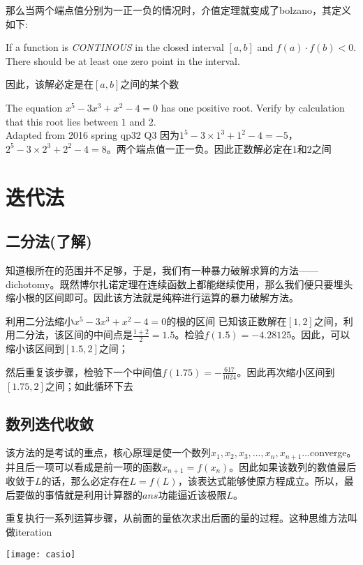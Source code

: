 那么当两个端点值分别为一正一负的情况时，介值定理就变成了\gls{bolzano}，其定义如下:
\begin{theorem}
If a function is \emph{CONTINOUS} in the closed interval $[a,b]$ and $f(a)\cdot f(b)<0$. There should be at least one zero point in the interval.
\end{theorem}
因此，该解必定是在$[a,b]$之间的某个数

\begin{ExampleBox}
The equation $x^5-3x^3+x^2-4=0$ has one positive root. Verify by calculation that this root lies between $1$ and $2$.\\
\makebox{}\hfill Adapted from 2016 spring qp32 Q3
\tcblower
因为$1^5-3\times 1^3+1^2-4=-5$，$2^5-3\times 2^3+2^2-4=8$。两个端点值一正一负。因此正数解必定在$1$和$2$之间
\end{ExampleBox}
\clearpage


\section{迭代法}
\subsection*{二分法(了解)}
知道根所在的范围并不足够，于是，我们有一种暴力破解求算的方法——\gls{dichotomy}。既然博尔扎诺定理在连续函数上都能继续使用，那么我们便只要埋头缩小根的区间即可。因此该方法就是纯粹进行运算的暴力破解方法。
\begin{ExampleBox}
利用二分法缩小$x^5-3x^3+x^2-4=0$的根的区间
\tcblower
已知该正数解在$[1,2]$之间，利用二分法，该区间的中间点是$\frac{1+2}{2}=1.5$。检验$f(1.5)=-4.28125$。因此，可以缩小该区间到$[1.5,2]$之间；

然后重复该步骤，检验下一个中间值$f(1.75)=-\frac{617}{1024}$。因此再次缩小区间到$[1.75,2]$之间；如此循环下去
\end{ExampleBox}
\clearpage

\subsection*{数列迭代收敛}
\noindent\begin{minipage}{0.5\linewidth}
该方法的是考试的重点，核心原理是使一个数列$x_1,x_2,x_3,\ldots,x_n,x_{n+1}\ldots$\gls{converge}。并且后一项可以看成是前一项的函数$x_{n+1}=f(x_n)$。因此如果该数列的数值最后收敛于$L$的话，那么必定存在$L=f(L)$，该表达式能够使原方程成立。所以，最后要做的事情就是利用计算器的$ans$功能逼近该极限$L$。

重复执行一系列运算步骤，从前面的量依次求出后面的量的过程。这种思维方法叫做\gls{iteration}
\end{minipage}
\hfill
\begin{minipage}{0.3\linewidth}
\texttt{[image: casio]}
\end{minipage}

